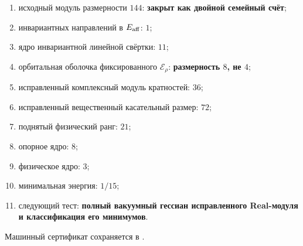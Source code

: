 \begin{protocol}
\begin{enumerate}
 \item исходный модуль размерности $144$: \textbf{закрыт как двойной
 семейный счёт};
 \item инвариантных направлений в $E_{\rm aff}$: \textbf{$1$};
 \item ядро инвариантной линейной свёртки: \textbf{$11$};
 \item орбитальная оболочка фиксированного $\mathcal E_\rho$:
 \textbf{размерность $8$, не $4$};
 \item исправленный комплексный модуль кратностей: \textbf{$36$};
 \item исправленный вещественный касательный размер: \textbf{$72$};
 \item поднятый физический ранг: \textbf{$21$};
 \item опорное ядро: \textbf{$8$};
 \item физическое ядро: \textbf{$3$};
 \item минимальная энергия: \textbf{$1/15$};
 \item следующий тест: \textbf{полный вакуумный гессиан исправленного
 Real-модуля и классификация его минимумов}.
\end{enumerate}
\end{protocol}

Машинный сертификат сохраняется в
.